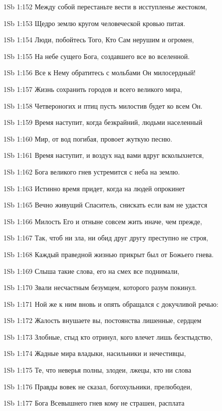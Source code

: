 \vs 1Sb 1:152 Между собой перестаньте вести в исступленье жестоком,

\vs 1Sb 1:153 Щедро землю кругом человеческой кровью питая.

\vs 1Sb 1:154 Люди, побойтесь Того, Кто Сам нерушим и огромен,

\vs 1Sb 1:155 На небе сущего Бога, создавшего все во вселенной.

\vs 1Sb 1:156 Все к Нему обратитесь с мольбами  Он милосердный! 

\vs 1Sb 1:157 Жизнь сохранить городов и всего великого мира,

\vs 1Sb 1:158 Четвероногих и птиц  пусть милостив будет ко всем Он.

\vs 1Sb 1:159 Время наступит, когда безкрайний, людьми населенный

\vs 1Sb 1:160 Мир, от вод погибая, провоет жуткую песню.

\vs 1Sb 1:161 Время наступит, и воздух над вами вдруг всколыхнется,

\vs 1Sb 1:162 Бога великого гнев устремится с неба на землю.

\vs 1Sb 1:163 Истинно время придет, когда на людей опрокинет

\vs 1Sb 1:165 Вечно живущий Спаситель, снискать если вам не удастся

\vs 1Sb 1:166 Милость Его и отныне совсем жить иначе, чем прежде,

\vs 1Sb 1:167 Так, чтоб ни зла, ни обид друг другу преступно не строя,

\vs 1Sb 1:168 Каждый праведной жизнью прикрыт был от Божьего гнева.

\vs 1Sb 1:169 Слыша такие слова, его на смех все поднимали,

\vs 1Sb 1:170 Звали несчастным безумцем, которого разум покинул.

\vs 1Sb 1:171 Ной же к ним вновь и опять обращался с докучливой речью:

\vs 1Sb 1:172 Жалость внушаете вы, постоянства лишенные, сердцем

\vs 1Sb 1:173 Злобные, стыд кто отринул, кого влечет лишь безстыдство,

\vs 1Sb 1:174 Жадные мира владыки, насильники и нечестивцы,

\vs 1Sb 1:175 Те, что неверья полны, злодеи, лжецы, кто ни слова

\vs 1Sb 1:176 Правды вовек не сказал, богохульники, прелюбодеи,

\vs 1Sb 1:177 Бога Всевышнего гнев кому не страшен,  расплата

